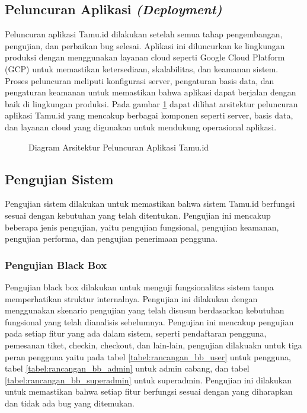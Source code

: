 \subsection{Peluncuran Aplikasi \textit{(Deployment)}}

Peluncuran aplikasi Tamu.id dilakukan setelah semua tahap pengembangan, pengujian, dan perbaikan bug selesai. Aplikasi ini diluncurkan ke lingkungan produksi dengan menggunakan layanan cloud seperti Google Cloud Platform (GCP) untuk memastikan ketersediaan, skalabilitas, dan keamanan sistem. Proses peluncuran meliputi konfigurasi server, pengaturan basis data, dan pengaturan keamanan untuk memastikan bahwa aplikasi dapat berjalan dengan baik di lingkungan produksi. Pada gambar \ref{fig:oth_deploy} dapat dilihat arsitektur peluncuran aplikasi Tamu.id yang mencakup berbagai komponen seperti server, basis data, dan layanan cloud yang digunakan untuk mendukung operasional aplikasi.

\begin{landscape}
    \begin{figure}[H]
        \centering
        
        \caption{Diagram Arsitektur Peluncuran Aplikasi Tamu.id}
        \label{fig:oth_deploy}
    \end{figure}
\end{landscape}

\subsection{Pengujian Sistem}

Pengujian sistem dilakukan untuk memastikan bahwa sistem Tamu.id berfungsi sesuai dengan kebutuhan yang telah ditentukan. Pengujian ini mencakup beberapa jenis pengujian, yaitu pengujian fungsional, pengujian keamanan, pengujian performa, dan pengujian penerimaan pengguna.

\subsubsection{Pengujian Black Box}

Pengujian black box dilakukan untuk menguji fungsionalitas sistem tanpa memperhatikan struktur internalnya. Pengujian ini dilakukan dengan menggunakan skenario pengujian yang telah disusun berdasarkan kebutuhan fungsional yang telah dianalisis sebelumnya. Pengujian ini mencakup pengujian pada setiap fitur yang ada dalam sistem, seperti pendaftaran pengguna, pemesanan tiket, checkin, checkout, dan lain-lain, pengujian dilakuakn untuk tiga peran pengguna yaitu pada tabel \ref{tabel:rancangan_bb_user} untuk pengguna, tabel \ref{tabel:rancangan_bb_admin} untuk admin cabang, dan tabel \ref{tabel:rancangan_bb_superadmin} untuk superadmin. Pengujian ini dilakukan untuk memastikan bahwa setiap fitur berfungsi sesuai dengan yang diharapkan dan tidak ada bug yang ditemukan.


